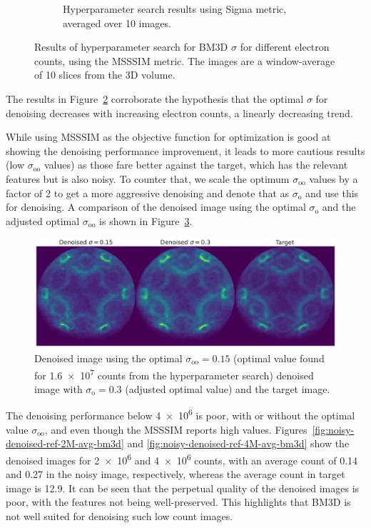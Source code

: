 \begin{figure}[h]
\begin{subfigure}[t]{0.49\linewidth}
        \caption{Hyperparameter search results using Sigma metric, averaged over 10 images.}
        \label{fig:hyperparameter-sigma-averaged-10-images}
    \end{subfigure}
    \caption{Results of hyperparameter search for \gls{BM3D} $\sigma$ for different electron counts, using the \gls{MSSSIM} metric. The images are a window-average of \num{10} slices from the 3D volume.}
    \label{fig:hyperparameter-averaged-10-images}
\end{figure}

The results in Figure~\ref{fig:hyperparameter-averaged-10-images} corroborate the hypothesis that the optimal $\sigma$ for denoising decreases with increasing electron counts, a linearly decreasing trend.

While using \gls{MSSSIM} as the objective function for optimization is good at showing the denoising performance improvement, it leads to more cautious results (low $\sigma_{\text{oo}}$ values) as those fare better against the target, which has the relevant features but is also noisy. To counter that, we scale the optimum $\sigma_{\text{oo}}$ values by a factor of 2 to get a more aggressive denoising and denote that as $\sigma_{\text{o}}$ and use this for denoising. A comparison of the denoised image using the optimal $\sigma_{\text{o}}$ and the adjusted optimal $\sigma_{\text{oo}}$ is shown in Figure~\ref{fig:denoised-optimal-sigma}.

\begin{figure}[h]
    \centering
    \includegraphics[width=1\linewidth]{images/denoised_optimal_sigma.pdf}
    \caption{Denoised image using the optimal $\sigma_{\text{oo}}=0.15$ (optimal value found for \num{1.6e7} counts from the hyperparameter search) denoised image with $\sigma_{\text{o}}=0.3$ (adjusted optimal value) and the target image.}
    \label{fig:denoised-optimal-sigma}
\end{figure}

The denoising performance below \num{4e6} is poor, with or without the optimal value $\sigma_{\text{oo}}$, and even though the \gls{MSSSIM} reports high values. Figures~\ref{fig:noisy-denoised-ref-2M-avg-bm3d} and \ref{fig:noisy-denoised-ref-4M-avg-bm3d} show the denoised images for \num{2e6} and \num{4e6} counts, with an average count of \num{0.14} and \num{0.27} in the noisy image, respectively, whereas the average count in target image is \num{12.9}. It can be seen that the perpetual quality of the denoised images is poor, with the features not being well-preserved. This highlights that \gls{BM3D} is not well suited for denoising such low count images.

